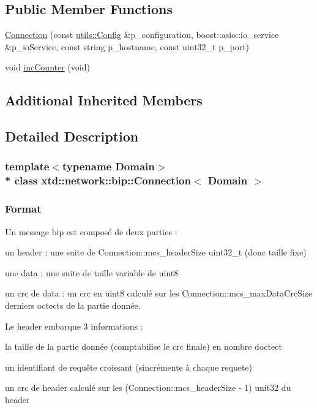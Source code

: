 \subsection*{Public Member Functions}
\begin{DoxyCompactItemize}
\item 
\hyperlink{classxtd_1_1network_1_1bip_1_1Connection_a5c981bbe6f8f26ac8eb25f70b2427d5c}{Connection} (const \hyperlink{classxtd_1_1network_1_1utils_1_1Config}{utils\+::\+Config} \&p\+\_\+configuration, boost\+::asio\+::io\+\_\+service \&p\+\_\+io\+Service, const string p\+\_\+hostname, const uint32\+\_\+t p\+\_\+port)
\item 
void \hyperlink{classxtd_1_1network_1_1bip_1_1Connection_acac00964a4fc76de35cdb516e9d73051}{inc\+Counter} (void)
\end{DoxyCompactItemize}
\subsection*{Additional Inherited Members}


\subsection{Detailed Description}
\subsubsection*{template$<$typename Domain$>$\\*
class xtd\+::network\+::bip\+::\+Connection$<$ Domain $>$}

\subsubsection*{Format }

Un message bip est composé de deux parties \+:
\begin{DoxyItemize}
\item un header \+: une suite de Connection\+::mcs\+\_\+header\+Size uint32\+\_\+t (donc taille fixe)
\item une data \+: une suite de taille variable de uint8
\item un crc de data \+: un crc en uint8 calculé sur les Connection\+::mcs\+\_\+max\+Data\+Crc\+Size derniers octects de la partie donnée.
\end{DoxyItemize}

Le header embarque 3 informations \+:
\begin{DoxyItemize}
\item la taille de la partie donnée (comptabilise le crc finale) en nombre d\textquotesingle{}octect
\item un identifiant de requête croissant (s\textquotesingle{}incrémente à chaque requete)
\item un crc de header calculé sur les (Connection\+::mcs\+\_\+header\+Size -\/ 1) unit32 du header
\end{DoxyItemize}


